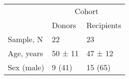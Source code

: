 \begin{tabular}{lll}
\toprule
\multirow{2}{*}{} & \multicolumn{2}{c}{Cohort} \\
\cmidrule(l){2-3}
 & Donors & Recipients \\
 \midrule
Sample, N & 22 & 23 \\
Age, years & 50 ± 11 & 47 ± 12 \\
Sex (male) & 9 (41) & 15 (65) \\
\bottomrule
\end{tabular}

